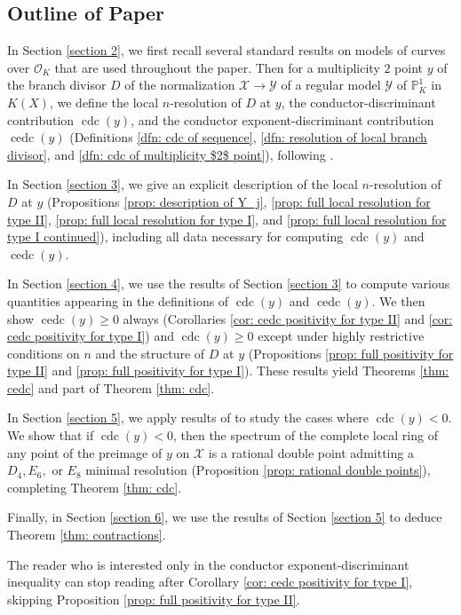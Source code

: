 \documentclass[12pt]{amsart}
\numberwithin{equation}{section}
\theoremstyle{definition}
\renewcommand{\O}{\mathcal{O}}
\renewcommand{\P}{\mathbb P}
\newcommand{\X}{\mathcal{X}}
\newcommand{\Y}{\mathcal{Y}}
\DeclareMathOperator{\cdc}{cdc}
\DeclareMathOperator{\cedc}{cedc}
\begin{document}
\subsection{Outline of Paper}\hfill

In Section \ref{section 2}, we first recall several standard results on models of curves over $\O_K$ that are used throughout the paper. Then for a multiplicity $2$ point $y$ of the branch divisor $D$ of the normalization $\X\to\Y$ of a regular model $\Y$ of $\P^1_K$ in $K(X)$, we define the local $n$-resolution of $D$ at $y$, the conductor-discriminant contribution $\cdc(y)$, and the conductor exponent-discriminant contribution $\cedc(y)$ (Definitions \ref{dfn: cdc of sequence}, \ref{dfn: resolution of local branch divisor}, and \ref{dfn: cdc of multiplicity $2$ point}), following \cite{Part1}. 

In Section \ref{section 3}, we give an explicit description of the local $n$-resolution of $D$ at $y$ (Propositions \ref{prop: description of Y_j}, \ref{prop: full local resolution for type II}, \ref{prop: full local resolution for type I}, and \ref{prop: full local resolution for type I continued}), including all data necessary for computing $\cdc(y)$ and $\cedc(y)$.

In Section \ref{section 4}, we use the results of Section \ref{section 3} to compute various quantities appearing in the definitions of $\cdc(y)$ and $\cedc(y)$. We then show $\cedc(y)\geq0$ always (Corollaries \ref{cor: cedc positivity for type II} and \ref{cor: cedc positivity for type I}) and $\cdc(y)\geq0$ except under highly restrictive conditions on $n$ and the structure of $D$ at $y$ (Propositions \ref{prop: full positivity for type II} and \ref{prop: full positivity for type I}). These results yield Theorems \ref{thm: cedc} and part of Theorem \ref{thm: cdc}.

In Section \ref{section 5}, we apply results of \cite[Section 24]{Lip69} to study the cases where $\cdc(y)<0$. We show that if $\cdc(y)<0$, then the spectrum of the complete local ring of any point of the preimage of $y$ on $\X$ is a rational double point admitting a $D_4,E_6,$ or $E_8$ minimal resolution (Proposition \ref{prop: rational double points}), completing Theorem \ref{thm: cdc}.

Finally, in Section \ref{section 6}, we use the results of Section \ref{section 5} to deduce Theorem \ref{thm: contractions}.

The reader who is interested only in the conductor exponent-discriminant inequality can stop reading after Corollary \ref{cor: cedc positivity for type I}, skipping Proposition \ref{prop: full positivity for type II}.
\end{document}
